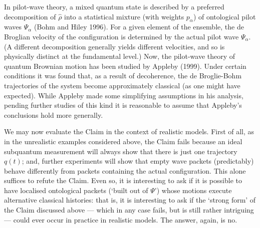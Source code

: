 \documentclass[12pt]{article}%
\begin{document}
In pilot-wave theory, a mixed quantum state is described by a preferred
decomposition of $\hat{\rho}$ into a statistical mixture (with weights
$p_{\alpha}$) of ontological pilot waves $\Psi_{\alpha}$ (Bohm and Hiley
1996). For a given element of the ensemble, the de Broglian velocity of the
configuration is determined by the actual pilot wave $\Psi_{\alpha}$. (A
different decomposition generally yields different velocities, and so is
physically distinct at the fundamental level.) Now, the pilot-wave theory of
quantum Brownian motion has been studied by Appleby (1999). Under certain
conditions it was found that, as a result of decoherence, the de Broglie-Bohm
trajectories of the system become approximately classical (as one might have
expected). While Appleby made some simplifying assumptions in his analysis,
pending further studies of this kind it is reasonable to assume that Appleby's
conclusions hold more generally.

We may now evaluate the Claim in the context of realistic models. First of
all, as in the unrealistic examples considered above, the Claim fails because
an ideal subquantum measurement will always show that there is just one
trajectory $q(t)$; and, further experiments will show that empty wave packets
(predictably) behave differently from packets containing the actual
configuration. This alone suffices to refute the Claim. Even so, it is
interesting to ask if it is possible to have localised ontological packets
(`built out of $\Psi$') whose motions execute alternative classical histories:
that is, it is interesting to ask if the `strong form' of the Claim discussed
above --- which in any case fails, but is still rather intriguing --- could
ever occur in practice in realistic models. The answer, again, is no.
\end{document}
